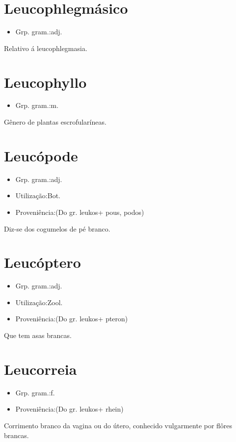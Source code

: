 \section{Leucophlegmásico}
\begin{itemize}
\item {Grp. gram.:adj.}
\end{itemize}
Relativo á leucophlegmasia.
\section{Leucophyllo}
\begin{itemize}
\item {Grp. gram.:m.}
\end{itemize}
Gênero de plantas escrofularíneas.
\section{Leucópode}
\begin{itemize}
\item {Grp. gram.:adj.}
\end{itemize}
\begin{itemize}
\item {Utilização:Bot.}
\end{itemize}
\begin{itemize}
\item {Proveniência:(Do gr. \textunderscore leukos\textunderscore  + \textunderscore pous\textunderscore , \textunderscore podos\textunderscore )}
\end{itemize}
Diz-se dos cogumelos de pé branco.
\section{Leucóptero}
\begin{itemize}
\item {Grp. gram.:adj.}
\end{itemize}
\begin{itemize}
\item {Utilização:Zool.}
\end{itemize}
\begin{itemize}
\item {Proveniência:(Do gr. \textunderscore leukos\textunderscore  + \textunderscore pteron\textunderscore )}
\end{itemize}
Que tem asas brancas.
\section{Leucorreia}
\begin{itemize}
\item {Grp. gram.:f.}
\end{itemize}
\begin{itemize}
\item {Proveniência:(Do gr. \textunderscore leukos\textunderscore  + \textunderscore rhein\textunderscore )}
\end{itemize}
Corrimento branco da vagina ou do útero, conhecido vulgarmente por flôres brancas.
